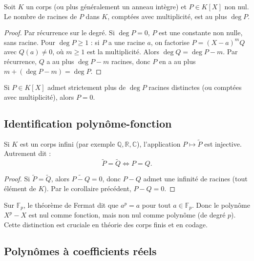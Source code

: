 \begin{theoreme}
Soit $K$ un corps (ou plus généralement un anneau intègre) et $P \in K[X]$ non nul. Le nombre de racines de $P$ dans $K$, comptées avec multiplicité, est au plus $\deg P$.
\end{theoreme}

\begin{proof}
Par récurrence sur le degré. Si $\deg P = 0$, $P$ est une constante non nulle, sans racine. Pour $\deg P \ge 1$ : si $P$ a une racine $a$, on factorise $P = (X - a)^m Q$ avec $Q(a) \neq 0$, où $m \ge 1$ est la multiplicité. Alors $\deg Q = \deg P - m$. Par récurrence, $Q$ a au plus $\deg P - m$ racines, donc $P$ en a au plus $m + (\deg P - m) = \deg P$.
\end{proof}

\begin{corollaire}
Si $P \in K[X]$ admet strictement plus de $\deg P$ racines distinctes (ou comptées avec multiplicité), alors $P = 0$.
\end{corollaire}

\subsection{Identification polynôme-fonction}

\begin{theoreme}
Si $K$ est un corps infini (par exemple $\mathbb{Q}, \mathbb{R}, \mathbb{C}$), l'application $P \mapsto \widetilde{P}$ est injective. Autrement dit :
\[ \widetilde{P} = \widetilde{Q} \iff P = Q. \]
\end{theoreme}

\begin{proof}
Si $\widetilde{P} = \widetilde{Q}$, alors $\widetilde{P - Q} = 0$, donc $P - Q$ admet une infinité de racines (tout élément de $K$). Par le corollaire précédent, $P - Q = 0$.
\end{proof}

\begin{remarque}
Sur $\mathbb{F}_p$, le théorème de Fermat dit que $a^p = a$ pour tout $a \in \mathbb{F}_p$. Donc le polynôme $X^p - X$ est nul comme fonction, mais non nul comme polynôme (de degré $p$). Cette distinction est cruciale en théorie des corps finis et en codage.
\end{remarque}

\subsection{Polynômes à coefficients réels}

